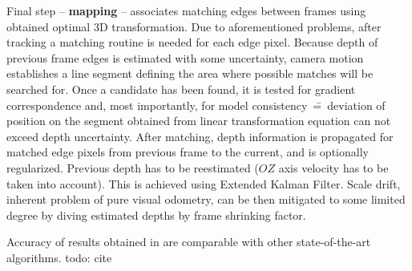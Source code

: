 Final step -- \textbf{mapping} -- associates matching edges between frames using obtained optimal 3D transformation. Due to aforementioned problems, after tracking a matching routine is needed for each edge pixel. Because depth of previous frame edges is estimated with some uncertainty, camera motion establishes a line segment defining the area where possible matches will be searched for. Once a candidate has been found, it is tested for gradient correspondence and, most importantly, for model consistency~\==~deviation of position on the segment obtained from linear transformation equation can not exceed depth uncertainty. After matching, depth information is propagated for matched edge pixels from previous frame to the current, and is optionally regularized. Previous depth has to be reestimated ($OZ$ axis velocity has to be taken into account). This is achieved using Extended Kalman Filter. Scale drift, inherent problem of pure visual odometry, can be then mitigated to some limited degree by diving estimated depths by frame shrinking factor.

Accuracy of results obtained in \cite{jose2015realtime} are comparable with other state-of-the-art algorithms. todo: cite \cite{yang2017direct}



